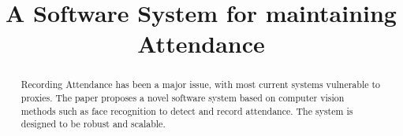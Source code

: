 \documentclass[conference]{IEEEtran}
\begin{document}
\title{A Software System for maintaining Attendance\\
}

\author{

}

\maketitle

\begin{abstract}
Recording Attendance has been a major issue, with most current systems vulnerable to proxies. The paper proposes a novel software system
based on computer vision methods such as face recognition to detect and record attendance. The system is designed to be robust and scalable.
\end{abstract}
\end{document}
